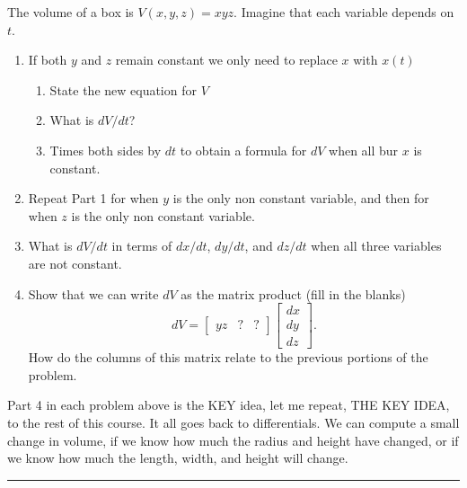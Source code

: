 \begin{problem}\label{prob:volumebox}
 The volume of a box is $V(x,y,z)=xyz$. Imagine that each variable depends on $t$. 
\begin{enumerate}
	\item If both $y$ and $z$ remain constant we only need to replace $x$ with $x(t)$
		\begin{enumerate}
			\item State the new equation for $V$
			\item What is $dV/dt$? 
			\item Times both sides by $dt$ to obtain a formula for $dV$ when all bur $x$ is constant.
		\end{enumerate}
	\item Repeat Part 1 for when $y$ is the only non constant variable, and then for when $z$ is the only non constant variable. 
	\item What is $dV/dt$ in terms of $dx/dt$, $dy/dt$, and $dz/dt$ when all three variables are not constant.
	\item%
% 
Show that we can write $dV$ as the matrix product (fill in the blanks) 
 $$dV = \begin{bmatrix}yz& ?&?\end{bmatrix}\begin{bmatrix}dx\\dy\\dz\end{bmatrix}.$$ 
 How do the columns of this matrix relate to the previous portions of the problem.
\end{enumerate}

\end{problem}

Part 4 in each problem above is the KEY idea, let me repeat, THE KEY IDEA, to the rest of this course. It all goes back to differentials. We can compute a small change in volume, if we know how much the radius and height have changed, or if we know how much the length, width, and height will change.  

\vskip0.1in
\hrule

